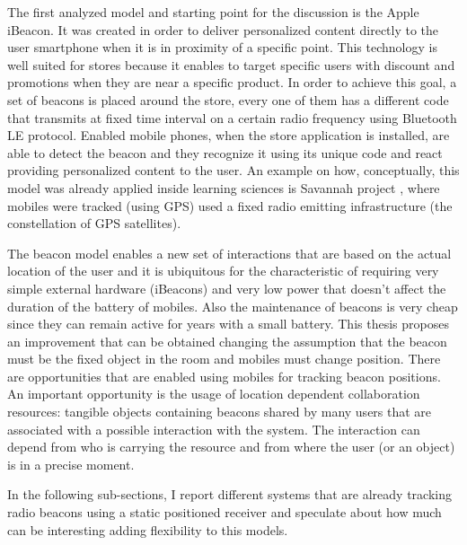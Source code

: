 The first analyzed model and starting point for the discussion is the Apple iBeacon. It was created in order to deliver personalized content directly to the user smartphone when it is in proximity of a specific point. This technology is well suited for stores because it enables to target specific users with discount and promotions when they are near a specific product. In order to achieve this goal, a set of beacons is placed around the store, every one of them has a different code that transmits at fixed time interval on a certain radio frequency using Bluetooth LE protocol. Enabled mobile phones, when the store application is installed, are able to detect the beacon and they recognize it using its unique code and react providing personalized content to the user. An example on how, conceptually, this model was already applied inside learning sciences is Savannah project \cite{facer:savannah}, where mobiles were tracked (using GPS) used a fixed radio emitting infrastructure (the constellation of GPS satellites). 

The beacon model enables a new set of interactions that are based on the actual location of the user and it is ubiquitous for the characteristic of requiring very simple external hardware (iBeacons) and very low power that doesn't affect the duration of the battery of mobiles. Also the maintenance of beacons is very cheap since they can remain active for years with a small battery. This thesis proposes an improvement that can be obtained changing the assumption that the beacon must be the fixed object in the room and mobiles must change position. There are opportunities that are enabled using mobiles for tracking beacon positions. An important opportunity is the usage of location dependent collaboration resources: tangible objects containing beacons shared by many users that are associated with a possible interaction with the system. The interaction can depend from who is carrying the resource and from where the user (or an object) is in a precise moment.

In the following sub-sections, I report different systems that are already tracking radio beacons using a static positioned receiver and speculate about how much can be interesting adding flexibility to this models.

